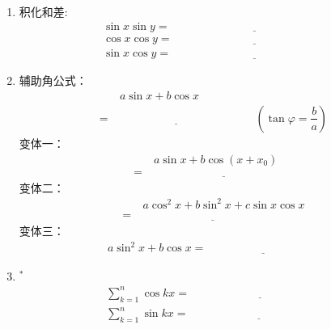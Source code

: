 \documentclass{article}
\newif\ifte
\begin{document}
\begin{multicols}{2}
\begin{enumerate}[leftmargin=20pt]
\item 积化和差:
\begin{align*}
    \sin x\sin y=&\ \underline{\ \ifte 
        \dfrac{1}{2}[\cos(x-y)-\cos(x+y)]
        \else \hspace{5cm} \fi\ } \\
    \cos x\cos y=&\ \underline{\ \ifte 
        \dfrac{1}{2}[\cos(x-y)+\cos(x+y)]
        \else \hspace{5cm} \fi\ } \\	
    \sin x\cos y=&\ \underline{\ \ifte 
        \dfrac{1}{2}[\sin(x+y)+\sin(x-y)] 
        \else \hspace{5cm} \fi\ }
\end{align*}

\item 辅助角公式：
\begin{align*}
     &\ a\sin x+b\cos x\\
    =&\ \underline{\ \ifte 
        \sqrt{a^2+b^2}\sin(x+\varphi)
        \else \hspace{4cm} \fi\ } \qquad
    \left(\tan \varphi=\dfrac{b}{a}\right)
\end{align*}
变体一：
\begin{align*}
     &\ a\sin x+b\cos (x+x_0) \\
    =&\ \underline{\ \ifte 
        a\sin x+b\cos x\cos x_0-b\sin x\sin x_0
        \else \hspace{5cm} \fi\ } 
\end{align*}
变体二：
\begin{align*}
     &\ a\cos^2x+b\sin^2x+c\sin x\cos x \\
    =&\ \underline{\ \ifte
    a\dfrac{\cos2x+1}{2} +b\dfrac{-\cos2x+1}{2}+
    \dfrac{c}{2}\sin2x  \else \hspace{5cm} \fi\ } 
\end{align*}
变体三：
\begin{align*}
    a\sin^2x+b\cos x=\underline{\ \ifte 
        a(1-\cos^2x)+b\cos x
        \else \hspace{4cm} \fi\ }
\end{align*}

\item $^*$ 
\begin{align*}
    &\sum_{k=1}^{n}\cos kx=\underline{\ \ifte 
    \dfrac{\sin\left( n+\dfrac{1}{2}\right) x-\sin 
        \dfrac{x}{2}}{2\sin \dfrac{x}{2}}    
        \else \hspace{5cm} \fi\ }  \\
    &\sum_{k=1}^{n}\sin kx=\underline{\ \ifte 
        \dfrac{-\cos\left( n+\dfrac{1}{2}\right) x+\cos 
        \dfrac{x}{2}}{2\sin \dfrac{x}{2}}
        \else \hspace{5cm} \fi\ }
\end{align*}


\end{enumerate}
\end{multicols}
\end{document}
